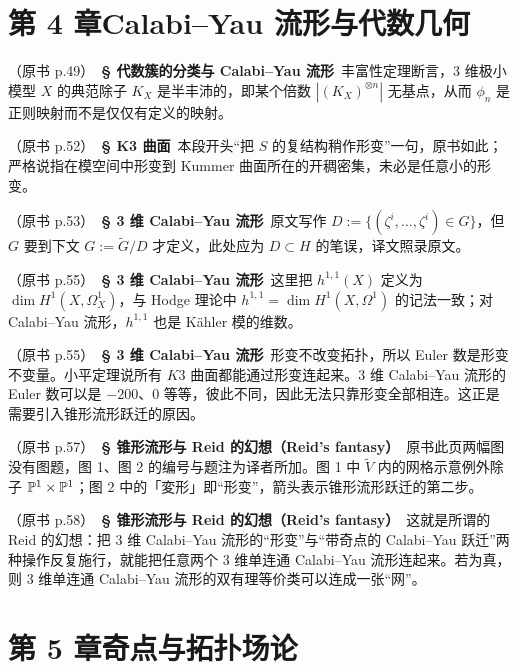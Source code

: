 \section*{第 4 章\quad Calabi--Yau 流形与代数几何}

\noindent （原书 p.49）\ \textbf{§ 代数簇的分类与 Calabi--Yau 流形}\ 丰富性定理断言，3 维极小模型 $X$ 的典范除子 $K_X$ 是半丰沛的，即某个倍数 $|(K_X)^{\otimes n}|$ 无基点，从而 $\phi_n$ 是正则映射而不是仅仅有定义的映射。\par\smallskip

\noindent （原书 p.52）\ \textbf{§ K3 曲面}\ 本段开头“把 $S$ 的复结构稍作形变”一句，原书如此；严格说指在模空间中形变到 Kummer 曲面所在的开稠密集，未必是任意小的形变。\par\smallskip

\noindent （原书 p.53）\ \textbf{§ 3 维 Calabi--Yau 流形}\ 原文写作 $D:=\{(\zeta^i,\dots,\zeta^i)\in G\}$，但 $G$ 要到下文 $G:=\widetilde{G}/D$ 才定义，此处应为 $D\subset H$ 的笔误，译文照录原文。\par\smallskip

\noindent （原书 p.55）\ \textbf{§ 3 维 Calabi--Yau 流形}\ 这里把 $h^{1,1}(X)$ 定义为 $\dim H^1(X,\Omega^1_X)$，与 Hodge 理论中 $h^{1,1}=\dim H^1(X,\Omega^1)$ 的记法一致；对 Calabi--Yau 流形，$h^{1,1}$ 也是 Kähler 模的维数。\par\smallskip

\noindent （原书 p.55）\ \textbf{§ 3 维 Calabi--Yau 流形}\ 形变不改变拓扑，所以 Euler 数是形变不变量。小平定理说所有 $K3$ 曲面都能通过形变连起来。3 维 Calabi--Yau 流形的 Euler 数可以是 $-200$、$0$ 等等，彼此不同，因此无法只靠形变全部相连。这正是需要引入锥形流形跃迁的原因。\par\smallskip

\noindent （原书 p.57）\ \textbf{§ 锥形流形与 Reid 的幻想（Reid's fantasy）}\ 原书此页两幅图没有图题，图 1、图 2 的编号与题注为译者所加。图 1 中 $\tilde{V}$ 内的网格示意例外除子 $\mathbb{P}^1\times\mathbb{P}^1$；图 2 中的「変形」即“形变”，箭头表示锥形流形跃迁的第二步。\par\smallskip

\noindent （原书 p.58）\ \textbf{§ 锥形流形与 Reid 的幻想（Reid's fantasy）}\ 这就是所谓的 Reid 的幻想：把 3 维 Calabi--Yau 流形的“形变”与“带奇点的 Calabi--Yau 跃迁”两种操作反复施行，就能把任意两个 3 维单连通 Calabi--Yau 流形连起来。若为真，则 3 维单连通 Calabi--Yau 流形的双有理等价类可以连成一张“网”。\par\smallskip

\section*{第 5 章\quad 奇点与拓扑场论}

